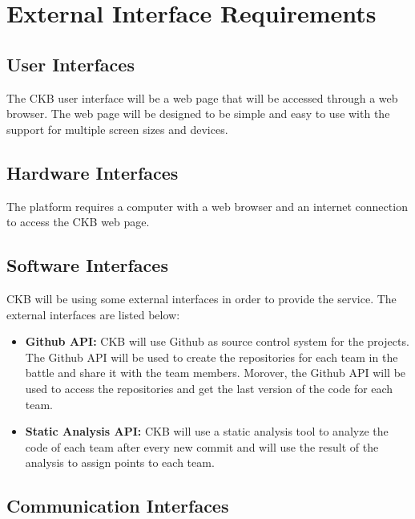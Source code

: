 
\section{External Interface Requirements}
\label{s:External_interface_requirements}%

\subsection{User Interfaces}
\label{ss:User_interfaces}%

The CKB user interface will be a web page that will be accessed through a web browser. The web page will be designed to be simple and easy to use with the support for multiple screen sizes and devices.

\subsection{Hardware Interfaces}
\label{ss:Hardware_interfaces}%

The platform requires a computer with a web browser and an internet connection to access the CKB web page. 

\subsection{Software Interfaces}
\label{ss:Software_interfaces}%

CKB will be using some external interfaces in order to provide the service. The external interfaces are listed below:
\begin{itemize}
  \item \textbf{Github API:} CKB will use Github as source control system for the projects. The Github API will be used to create the repositories for each team in the battle and share it with the team members. Morover, the Github API will be used to access the repositories and get the last version of the code for each team. 
  \item \textbf{Static Analysis API:} CKB will use a static analysis tool to analyze the code of each team after every new commit and will use the result of the analysis to assign points to each team.
\end{itemize}

\subsection{Communication Interfaces}
\label{ss:Communication_interfaces}%

